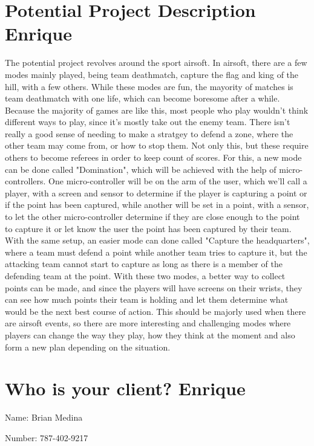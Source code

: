 \documentclass[12pt]{article}
\begin{document}
\section{Potential Project Description Enrique}
The potential project revolves around the sport airsoft. In airsoft, there are a few modes mainly played, being team deathmatch, capture the flag and king of the hill, with a few others. While these modes are fun, the mayority of matches is team deathmatch with one life, which can become boresome after a while. Because the majority of games are like this, most people who play wouldn't think different ways to play, since it's mostly take out the enemy team. There isn't really a good sense of needing to make a stratgey to defend a zone, where the other team may come from, or how to stop them. Not only this, but these require others to become referees in order to keep count of scores. For this, a new mode can be done called "Domination", which will be achieved with the help of micro-controllers. One micro-controller will be on the arm of the user, which we'll call a player, with a screen and sensor to determine if the player is capturing a point or if the point has been captured, while another will be set in a point, with a sensor, to let the other micro-controller determine if they are close enough to the point to capture it or let know the user the point has been captured by their team. With the same setup, an easier mode can done called "Capture the headquarters", where a team must defend a point while another team tries to capture it, but the attacking team cannot start to capture as long as there is a member of the defending team at the point. With these two modes, a better way to collect points can be made, and since the players will have screens on their wrists, they can see how much points their team is holding and let them determine what would be the next best course of action. This should be majorly used when there are airsoft events, so there are more interesting and challenging modes where players can change the way they play, how they think at the moment and also form a new plan depending on the situation.
\section{Who is your client? Enrique}
Name: Brian Medina

Number: 787-402-9217
\end{document}
